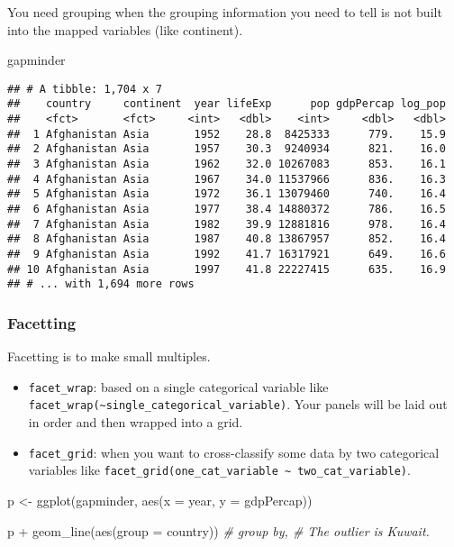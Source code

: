 \documentclass[
]{book}
\newenvironment{Shaded}{\begin{snugshade}}{\end{snugshade}}
\newcommand{\AttributeTok}[1]{\textcolor[rgb]{0.77,0.63,0.00}{#1}}
\newcommand{\CommentTok}[1]{\textcolor[rgb]{0.56,0.35,0.01}{\textit{#1}}}
\newcommand{\FunctionTok}[1]{\textcolor[rgb]{0.00,0.00,0.00}{#1}}
\newcommand{\NormalTok}[1]{#1}
\newcommand{\OtherTok}[1]{\textcolor[rgb]{0.56,0.35,0.01}{#1}}
\newcommand{\SpecialCharTok}[1]{\textcolor[rgb]{0.00,0.00,0.00}{#1}}
\begin{document}
You need grouping when the grouping information you need to tell is not built into the mapped variables (like continent).

\begin{Shaded}
\begin{Highlighting}[]
\NormalTok{gapminder}
\end{Highlighting}
\end{Shaded}

\begin{verbatim}
## # A tibble: 1,704 x 7
##    country     continent  year lifeExp      pop gdpPercap log_pop
##    <fct>       <fct>     <int>   <dbl>    <int>     <dbl>   <dbl>
##  1 Afghanistan Asia       1952    28.8  8425333      779.    15.9
##  2 Afghanistan Asia       1957    30.3  9240934      821.    16.0
##  3 Afghanistan Asia       1962    32.0 10267083      853.    16.1
##  4 Afghanistan Asia       1967    34.0 11537966      836.    16.3
##  5 Afghanistan Asia       1972    36.1 13079460      740.    16.4
##  6 Afghanistan Asia       1977    38.4 14880372      786.    16.5
##  7 Afghanistan Asia       1982    39.9 12881816      978.    16.4
##  8 Afghanistan Asia       1987    40.8 13867957      852.    16.4
##  9 Afghanistan Asia       1992    41.7 16317921      649.    16.6
## 10 Afghanistan Asia       1997    41.8 22227415      635.    16.9
## # ... with 1,694 more rows
\end{verbatim}

\hypertarget{facetting}{%
\subsubsection{Facetting}\label{facetting}}

Facetting is to make small multiples.

\begin{itemize}
\item
  \texttt{facet\_wrap}: based on a single categorical variable like \texttt{facet\_wrap(\textasciitilde{}single\_categorical\_variable)}. Your panels will be laid out in order and then wrapped into a grid.
\item
  \texttt{facet\_grid}: when you want to cross-classify some data by two categorical variables like \texttt{facet\_grid(one\_cat\_variable\ \textasciitilde{}\ two\_cat\_variable)}.
\end{itemize}

\begin{Shaded}
\begin{Highlighting}[]
\NormalTok{p }\OtherTok{\textless{}{-}} \FunctionTok{ggplot}\NormalTok{(gapminder, }\FunctionTok{aes}\NormalTok{(}\AttributeTok{x =}\NormalTok{ year, }\AttributeTok{y =}\NormalTok{ gdpPercap))}

\NormalTok{p }\SpecialCharTok{+} \FunctionTok{geom\_line}\NormalTok{(}\FunctionTok{aes}\NormalTok{(}\AttributeTok{group =}\NormalTok{ country)) }\CommentTok{\# group by, \# The outlier is Kuwait.}
\end{Highlighting}
\end{Shaded}
\end{document}

